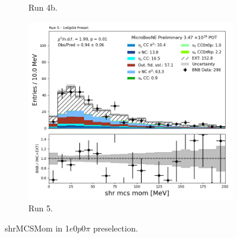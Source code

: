 \begin{figure}[H]
\begin{subfigure}[t]{0.32\linewidth}
        \caption{Run 4b.}
    \end{subfigure}%
    \hspace{0.2cm}%
    \begin{subfigure}[t]{0.32\linewidth}
        \includegraphics[width=\linewidth]{technote/Appendix_Preselection/Figures/1e0p0pi/Run5/shrMCSMom_Run5_1e0p0pi_Presel.png}
        \caption{Run 5.}
    \end{subfigure}
    \caption{shrMCSMom in 1$e$0$p$0$\pi$ preselection.}
\end{figure}

